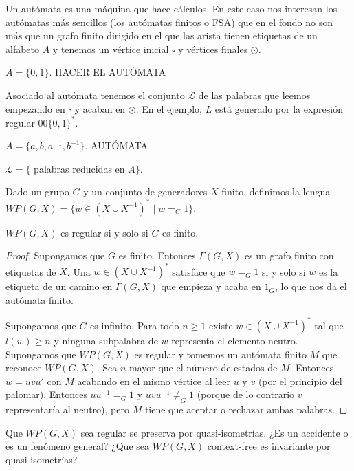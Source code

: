 \documentclass[twoside, 11pt]{article}
\begin{document}
Un autómata es una máquina que hace cálculos. En este caso nos interesan los autómatas más sencillos (los autómatas finitos o FSA) que en el fondo no son más que un grafo finito dirigido en el que las arista tienen etiquetas de un alfabeto $A$ y tenemos un vértice inicial $\square$ y vértices finales $\odot$.

\begin{ej}
$A=\{0,1\}$.
HACER EL AUTÓMATA

Asociado al autómata tenemos el conjunto $\mathcal{L}$ de las palabras que leemos empezando en $\square$ y acaban en $\odot$. En el ejemplo, $L$ está generado por la expresión regular $00\{0,1\}^*$.
\end{ej}

\begin{ej}
$A=\{a,b,a^{-1},b^{-1}\}$. AUTÓMATA

$\mathcal{L}=\{$ palabras reducidas en $A\}$.
\end{ej}

Dado un grupo $G$ y un conjunto de generadores $X$ finito, definimos la lengua $WP(G,X)=\{w\in (X\cup X^{-1})^*\mid w=_G 1\}$.

\begin{lemma}[Anisimov]
$WP(G,X)$ es regular si y solo si $G$ es finito.
\end{lemma}
\begin{proof}
Supongamos que $G$ es finito. Entonces $\Gamma(G,X)$ es un grafo finito con etiquetas de $X$. Una $w\in (X\cup X^{-1})^*$ satisface que $w=_G1$ si y solo si $w$ es la etiqueta de un camino en $\Gamma(G,X)$ que empieza y acaba en $1_G$, lo que nos da el autómata finito.

Supongamos que $G$ es infinito. Para todo $n\geq 1$ existe $w\in (X\cup X^{-1})^*$ tal que $l(w)\geq n$ y ninguna subpalabra de $w$ representa el elemento neutro. Supongamos que $WP(G,X)$ es regular y tomemos un autómata finito $M$ que reconoce $WP(G,X)$. Sea $n$ mayor que el número de estados de $M$. Entonces $w=uvu'$ con $M$ acabando en el mismo vértice al leer $u$ y $v$ (por el principio del palomar). Entonces $uu^{-1}=_G 1$ y $uvu^{-1}\neq_G 1$ (porque de lo contrario $v$ representaría al neutro), pero $M$ tiene que aceptar o rechazar ambas palabras. 
\end{proof}

\begin{observacion}
Que $WP(G,X)$ sea regular se preserva por quasi-isometrías. ¿Es un accidente o es un fenómeno general? ¿Que sea $WP(G,X)$ context-free es invariante por quasi-isometrías?
\end{observacion}
\end{document}
